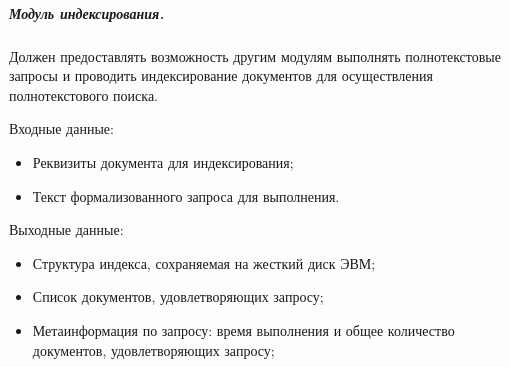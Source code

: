 \subparagraph{Модуль индексирования.} \hfill

Должен предоставлять возможность другим модулям выполнять полнотекстовые запросы и проводить индексирование документов для осуществления полнотекстового поиска.

Входные данные:
\begin{itemize}
\item Реквизиты документа для индексирования;
\item Текст формализованного запроса для выполнения.
\end{itemize}

Выходные данные:
\begin{itemize}
\item Структура индекса, сохраняемая на жесткий диск ЭВМ;
\item Список документов, удовлетворяющих запросу;
\item Метаинформация по запросу: время выполнения и общее количество документов, удовлетворяющих запросу;
\end{itemize}